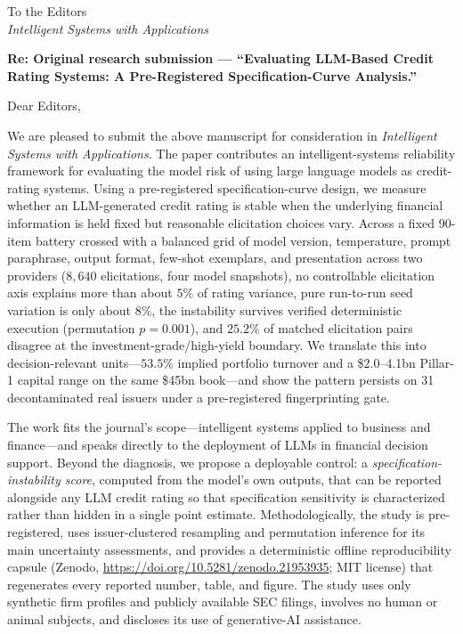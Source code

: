 \documentclass[11pt]{article}
\begin{document}
\noindent To the Editors\\
\emph{Intelligent Systems with Applications}

\vspace{6pt}
\noindent\textbf{Re: Original research submission --- ``Evaluating LLM-Based Credit Rating Systems: A Pre-Registered Specification-Curve Analysis.''}

\vspace{6pt}
\noindent Dear Editors,

We are pleased to submit the above manuscript for consideration in \emph{Intelligent Systems with Applications}. The paper contributes an intelligent-systems reliability framework for evaluating the model risk of using large language models as credit-rating systems. Using a pre-registered specification-curve design, we measure whether an LLM-generated credit rating is stable when the underlying financial information is held fixed but reasonable elicitation choices vary. Across a fixed 90-item battery crossed with a balanced grid of model version, temperature, prompt paraphrase, output format, few-shot exemplars, and presentation across two providers ($8{,}640$ elicitations, four model snapshots), no controllable elicitation axis explains more than about $5\%$ of rating variance, pure run-to-run seed variation is only about $8\%$, the instability survives verified deterministic execution (permutation $p=0.001$), and $25.2\%$ of matched elicitation pairs disagree at the investment-grade/high-yield boundary. We translate this into decision-relevant units---$53.5\%$ implied portfolio turnover and a \$2.0--4.1bn Pillar-1 capital range on the same \$45bn book---and show the pattern persists on 31 decontaminated real issuers under a pre-registered fingerprinting gate.

The work fits the journal's scope---intelligent systems applied to business and finance---and speaks directly to the deployment of LLMs in financial decision support. Beyond the diagnosis, we propose a deployable control: a \emph{specification-instability score}, computed from the model's own outputs, that can be reported alongside any LLM credit rating so that specification sensitivity is characterized rather than hidden in a single point estimate. Methodologically, the study is pre-registered, uses issuer-clustered resampling and permutation inference for its main uncertainty assessments, and provides a deterministic offline reproducibility capsule (Zenodo, \url{https://doi.org/10.5281/zenodo.21953935}; MIT license) that regenerates every reported number, table, and figure. The study uses only synthetic firm profiles and publicly available SEC filings, involves no human or animal subjects, and discloses its use of generative-AI assistance.
\end{document}
